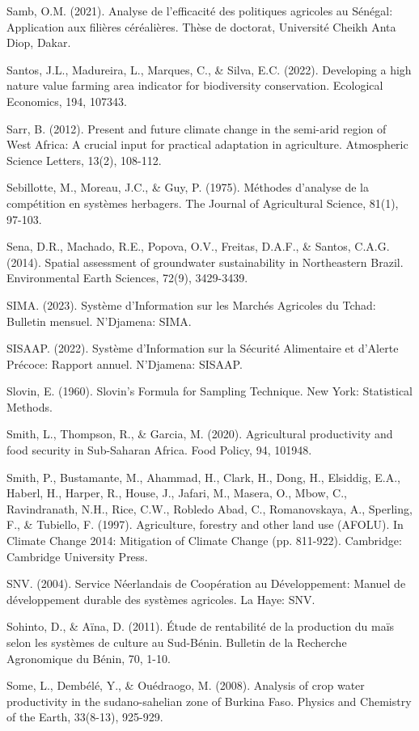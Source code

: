 \documentclass[12pt,oneside]{report}
\begin{document}
Samb, O.M. (2021). Analyse de l'efficacité des politiques agricoles au Sénégal: Application aux filières céréalières. Thèse de doctorat, Université Cheikh Anta Diop, Dakar.

Santos, J.L., Madureira, L., Marques, C., \& Silva, E.C. (2022). Developing a high nature value farming area indicator for biodiversity conservation. Ecological Economics, 194, 107343.

Sarr, B. (2012). Present and future climate change in the semi-arid region of West Africa: A crucial input for practical adaptation in agriculture. Atmospheric Science Letters, 13(2), 108-112.

Sebillotte, M., Moreau, J.C., \& Guy, P. (1975). Méthodes d'analyse de la compétition en systèmes herbagers. The Journal of Agricultural Science, 81(1), 97-103.

Sena, D.R., Machado, R.E., Popova, O.V., Freitas, D.A.F., \& Santos, C.A.G. (2014). Spatial assessment of groundwater sustainability in Northeastern Brazil. Environmental Earth Sciences, 72(9), 3429-3439.

SIMA. (2023). Système d'Information sur les Marchés Agricoles du Tchad: Bulletin mensuel. N'Djamena: SIMA.

SISAAP. (2022). Système d'Information sur la Sécurité Alimentaire et d'Alerte Précoce: Rapport annuel. N'Djamena: SISAAP.

Slovin, E. (1960). Slovin's Formula for Sampling Technique. New York: Statistical Methods.

Smith, L., Thompson, R., \& Garcia, M. (2020). Agricultural productivity and food security in Sub-Saharan Africa. Food Policy, 94, 101948.

Smith, P., Bustamante, M., Ahammad, H., Clark, H., Dong, H., Elsiddig, E.A., Haberl, H., Harper, R., House, J., Jafari, M., Masera, O., Mbow, C., Ravindranath, N.H., Rice, C.W., Robledo Abad, C., Romanovskaya, A., Sperling, F., \& Tubiello, F. (1997). Agriculture, forestry and other land use (AFOLU). In Climate Change 2014: Mitigation of Climate Change (pp. 811-922). Cambridge: Cambridge University Press.

SNV. (2004). Service Néerlandais de Coopération au Développement: Manuel de développement durable des systèmes agricoles. La Haye: SNV.

Sohinto, D., \& Aïna, D. (2011). Étude de rentabilité de la production du maïs selon les systèmes de culture au Sud-Bénin. Bulletin de la Recherche Agronomique du Bénin, 70, 1-10.

Some, L., Dembélé, Y., \& Ouédraogo, M. (2008). Analysis of crop water productivity in the sudano-sahelian zone of Burkina Faso. Physics and Chemistry of the Earth, 33(8-13), 925-929.
\end{document}
